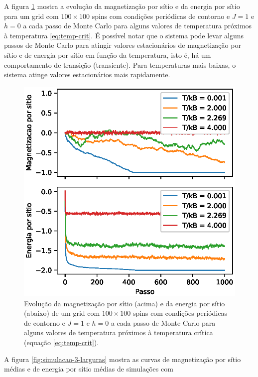 A figura \ref{fig:evolucao-mc-temperaturas} mostra a evolução da magnetização por sítio e da energia por sítio para um grid com $100 \times 100$ spins com condições periódicas de contorno e $J = 1$ e $h = 0$ a cada passo de Monte Carlo para alguns valores de temperatura próximos à temperatura \ref{eq:temp-crit}. É possível notar que o sistema pode levar alguns passos de Monte Carlo para atingir valores estacionários de magnetização por sítio e de energia por sítio em função da temperatura, isto é, há um comportamento de transição (transiente). Para temperaturas mais baixas, o sistema atinge valores estacionários mais rapidamente.

\begin{figure}[ht]
	\centering
	\includegraphics[scale = 1]{./img/evolucao-mc-temperaturas}
    \caption{Evolução da magnetização por sítio (acima) e da energia por sítio (abaixo) de um grid com $100 \times 100$ spins com condições periódicas de contorno e $J = 1$ e $h = 0$ a cada passo de Monte Carlo para alguns valores de temperatura próximos à temperatura crítica (equação \ref{eq:temp-crit}).}
    \label{fig:evolucao-mc-temperaturas}
\end{figure}

A figura \ref{fig:simulacao-3-larguras} mostra as curvas de magnetização por sítio médias e de energia por sítio médias de simulações com 

